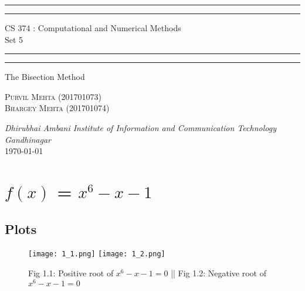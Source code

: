 \documentclass{article}
\begin{document}
\begin{titlepage}
	\centering 
	\scshape
	\vspace*{\baselineskip}
	\rule{\textwidth}{1.6pt}\vspace*{-\baselineskip}\vspace*{2pt}
	\rule{\textwidth}{0.4pt} 
	\vspace{0.75\baselineskip}
	
	{\Large CS 374 : Computational and Numerical Methods \\\vspace{0.75\baselineskip} Set 5}
	\vspace{0.75\baselineskip}
	
	\rule{\textwidth}{0.4pt}\vspace*{-\baselineskip}\vspace{3.2pt} 
	\rule{\textwidth}{1.6pt}
	
	\vspace{2\baselineskip}  
	The Bisection Method
	
	\vspace*{3\baselineskip}
	
	\vspace{0.5\baselineskip} %
	
	{\scshape\large Purvil Mehta (201701073) \\ Bhargey Mehta (201701074) \\} 
	
	\vspace{1\baselineskip} 
	
	\textit{Dhirubhai Ambani Institute of Information and Communication Technology \\ Gandhinagar\\} 
	\vspace*{2\baselineskip}
	\today


\end{titlepage}

\newpage
\tableofcontents
\newpage

\section{$f(x)$ = $x^6 - x - 1$}
\subsection{Plots}
\begin{figure}[!h]
    \centering
    \texttt{[image: 1\_1.png]}
    \texttt{[image: 1\_2.png]}
    \caption{Fig 1.1: Positive root of $x^6 - x -1 = 0$ 
     || Fig 1.2: Negative root of $x^6 - x -1 = 0$}
\end{figure}
\end{document}
